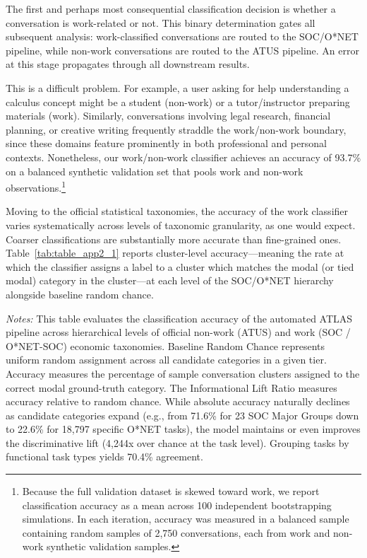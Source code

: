 \documentclass[11pt,a4paper]{article}
\begin{document}
The first and perhaps most consequential classification decision is whether a conversation is work-related or not. This binary determination gates all subsequent analysis: work-classified conversations are routed to the SOC/O*NET pipeline, while non-work conversations are routed to the ATUS pipeline. An error at this stage propagates through all downstream results.

This is a difficult problem. For example, a user asking for help understanding a calculus concept might be a student (non-work) or a tutor/instructor preparing materials (work). Similarly, conversations involving legal research, financial planning, or creative writing frequently straddle the work/non-work boundary, since these domains feature prominently in both professional and personal contexts. Nonetheless, our work/non-work classifier achieves an accuracy of 93.7\% on a balanced synthetic validation set that pools work and non-work observations.\footnote{Because the full validation dataset is skewed toward work, we report classification accuracy as a mean across 100 independent bootstrapping simulations. In each iteration, accuracy was measured in a balanced sample containing random samples of 2,750 conversations, each from work and non-work synthetic validation samples.}

Moving to the official statistical taxonomies, the accuracy of the work classifier varies systematically across levels of taxonomic granularity, as one would expect. Coarser classifications are substantially more accurate than fine-grained ones. Table~\ref{tab:table_app2_1} reports cluster-level accuracy---meaning the rate at which the classifier assigns a label to a cluster which matches the modal (or tied modal) category in the cluster---at each level of the SOC/O*NET hierarchy alongside baseline random chance.

\begin{table}[htbp]
    \centering
    \caption{Automated Classifier Performance Significantly Outperforms Random Chance, Especially in Fine-Grained Taxonomies}
    \label{tab:table_app2_1}

    \parbox{\textwidth}{\footnotesize \textit{Notes:} This table evaluates the classification accuracy of the automated ATLAS pipeline across hierarchical levels of official non-work (ATUS) and work (SOC / O*NET-SOC) economic taxonomies. Baseline Random Chance represents uniform random assignment across all candidate categories in a given tier. Accuracy measures the percentage of sample conversation clusters assigned to the correct modal ground-truth category. The Informational Lift Ratio measures accuracy relative to random chance. While absolute accuracy naturally declines as candidate categories expand (e.g., from 71.6\% for 23 SOC Major Groups down to 22.6\% for 18,797 specific O*NET tasks), the model maintains or even improves the discriminative lift (4,244x over chance at the task level). Grouping tasks by \cite{NBERw33941} functional task types yields 70.4\% agreement.}
\end{table}
\end{document}
